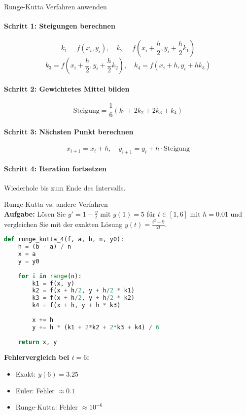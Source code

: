 \begin{KR}{Runge-Kutta Verfahren anwenden}
\paragraph{Schritt 1: Steigungen berechnen}
\vspace{-2mm}
$$k_1 = f(x_i, y_i), \quad
k_2 = f(x_i + \frac{h}{2}, y_i + \frac{h}{2} k_1)$$
$$k_3 = f(x_i + \frac{h}{2}, y_i + \frac{h}{2} k_2), \quad
k_4 = f(x_i + h, y_i + h k_3)$$

\paragraph{Schritt 2: Gewichtetes Mittel bilden}
\vspace{-2mm}
$$\text{Steigung} = \frac{1}{6}(k_1 + 2k_2 + 2k_3 + k_4)$$

\paragraph{Schritt 3: Nächsten Punkt berechnen}
\vspace{-2mm}
$$x_{i+1} = x_i + h, \quad
y_{i+1} = y_i + h \cdot \text{Steigung}$$

\paragraph{Schritt 4: Iteration fortsetzen}
Wiederhole bis zum Ende des Intervalls.
\end{KR}

\begin{example2}{Runge-Kutta vs. andere Verfahren}\\
\textbf{Aufgabe:} Lösen Sie $y' = 1 - \frac{y}{t}$ mit $y(1) = 5$ für $t \in [1,6]$ mit $h = 0.01$ und vergleichen Sie mit der exakten Lösung $y(t) = \frac{t^2 + 9}{2t}$.

\begin{lstlisting}[language=Python, style=basesmol]
def runge_kutta_4(f, a, b, n, y0):
    h = (b - a) / n
    x = a
    y = y0
    
    for i in range(n):
        k1 = f(x, y)
        k2 = f(x + h/2, y + h/2 * k1)
        k3 = f(x + h/2, y + h/2 * k2)
        k4 = f(x + h, y + h * k3)
        
        x += h
        y += h * (k1 + 2*k2 + 2*k3 + k4) / 6
        
    return x, y
\end{lstlisting}

\textbf{Fehlervergleich bei $t = 6$:}
\begin{itemize}
    \item Exakt: $y(6) = 3.25$
    \item Euler: Fehler $\approx 0.1$
    \item Runge-Kutta: Fehler $\approx 10^{-6}$
\end{itemize}
\end{example2}

